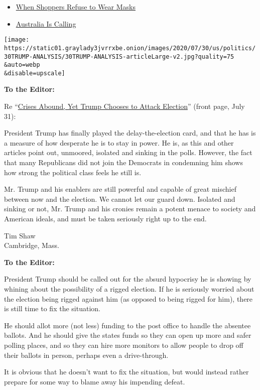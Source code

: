 \begin{itemize}
\tightlist
\item
  \protect\hyperlink{link-dcc4adc}{When Shoppers Refuse to Wear Masks}
\item
  \protect\hyperlink{link-597dc11b}{Australia Is Calling}
\end{itemize}

\texttt{[image: https://static01.graylady3jvrrxbe.onion/images/2020/07/30/us/politics/30TRUMP-ANALYSIS/30TRUMP-ANALYSIS-articleLarge-v2.jpg?quality=75\\\&auto=webp\\\&disable=upscale]}

\textbf{To the Editor:}

Re
``\href{https://www.nytimes3xbfgragh.onion/2020/07/30/us/politics/trump-delay-election.html}{Crises
Abound, Yet Trump Chooses to Attack Election}'' (front page, July 31):

President Trump has finally played the delay-the-election card, and that
he has is a measure of how desperate he is to stay in power. He is, as
this and other articles point out, unmoored, isolated and sinking in the
polls. However, the fact that many Republicans did not join the
Democrats in condemning him shows how strong the political class feels
he still is.

Mr. Trump and his enablers are still powerful and capable of great
mischief between now and the election. We cannot let our guard down.
Isolated and sinking or not, Mr. Trump and his cronies remain a potent
menace to society and American ideals, and must be taken seriously right
up to the end.

Tim Shaw\\
Cambridge, Mass.

\textbf{To the Editor:}

President Trump should be called out for the absurd hypocrisy he is
showing by whining about the possibility of a rigged election. If he is
seriously worried about the election being rigged against him (as
opposed to being rigged for him), there is still time to fix the
situation.

He should allot more (not less) funding to the post office to handle the
absentee ballots. And he should give the states funds so they can open
up more and safer polling places, and so they can hire more monitors to
allow people to drop off their ballots in person, perhaps even a
drive-through.

It is obvious that he doesn't want to fix the situation, but would
instead rather prepare for some way to blame away his impending defeat.

